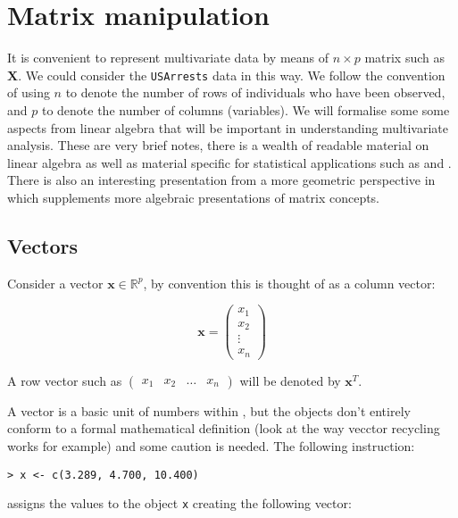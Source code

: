 \chapter{Matrix manipulation}
\label{ChMatrix}

It is convenient to represent multivariate data by means of $n \times p$ matrix such as $\boldsymbol{X}$.  We could consider the \texttt{USArrests} data in this way.   We follow the convention of using $n$ to denote the number of rows of individuals who have been observed, and $p$ to denote the number of columns (variables).   %
We will formalise some some aspects from linear algebra that will be important in understanding multivariate analysis.   These are very brief notes, there is a wealth of readable material on linear algebra as well as material specific for statistical applications such as \cite{Healy:2000} and \cite{Schott:1997}.   There is also an interesting presentation from a more geometric perspective in \cite{Wickens:1995} which supplements more algebraic presentations of matrix concepts.

\section{Vectors}
\label{vectors}

Consider a vector $\boldsymbol{x} \in \mathbb{R}^{p}$, by convention this is thought of as a column vector:

\begin{displaymath}
\boldsymbol{x}  = \left(\begin{array}{r} x_{1} \\ x_{2} \\ \vdots \\ x_{n} \end{array}\right)
\end{displaymath}

 A row vector such as $\left(\begin{array}{rrrr} x_{1} & x_{2} & \ldots & x_{n} \end{array} \right)$ will be denoted by $\boldsymbol{x}^{T}$.

A vector is a basic unit of numbers within \R, but the \R objects don't entirely conform to a formal mathematical definition (look at the way vecctor recycling works for example) and some caution is needed.   The following instruction:
\singlespacing
\begin{verbatim}
> x <- c(3.289, 4.700, 10.400) 
\end{verbatim}
\onehalfspacing
assigns the values to the object \verb+x+ creating the following \R vector:

